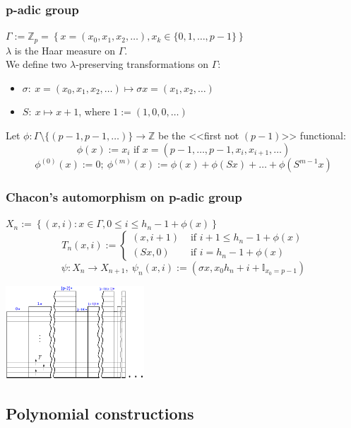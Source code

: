 \begin{frame}
    \frametitle{p-adic group}
    $\Gamma := \mathbb{Z}_p = \left\{x = \left(x_0, x_1, x_2, \ldots \right), x_k \in \{0, 1, \ldots, p - 1\} \right\}$\\
    $\lambda$ is the Haar measure on $\Gamma$. \\
    We define two $\lambda$-preserving transformations on $\Gamma$:\\
    \begin{itemize}
    \item $\sigma:\ x=\left(x_0, x_1, x_2, \ldots \right) \mapsto \sigma x = \left(x_1, x_2, \ldots \right)$
    \item $S:\ x \mapsto x + 1$, where $1:=(1,0,0,\ldots)$
    \end{itemize}
    Let $\phi: \Gamma \setminus \{(p-1,p-1,\ldots)\} \rightarrow \mathbb{Z}$ be the <<first not $(p-1)$>> functional:\\
    \[\phi(x):=x_i\text{ if }x=(p-1, \ldots, p-1, x_i, x_{i+1}, \ldots)\]
    \[\phi^{(0)}(x):=0;\ \phi^{(m)}(x):=\phi(x)+\phi(Sx)+\ldots+\phi(S^{m-1}x)\]
\end{frame}

\begin{frame}
    \frametitle{Chacon's automorphism on p-adic group}  
    $X_n := \left\{(x, i): x \in \Gamma, 0 \le i \le h_n - 1 + \phi(x)\right\}$\\    
    \[
        T_n(x, i):= \begin{cases} 
            (x, i+1) & \text{ if } i+1 \le h_n-1+\phi(x)\\
            (Sx, 0) & \text{ if } i = h_n - 1 + \phi(x)
            \end{cases}
    \]
    \[\psi: X_n \rightarrow X_{n+1},\ \psi_n(x, i) := (\sigma x, x_0 h_n + i + \mathbb{I}_{x_0 = p-1})\]
  \begin{center}
  \includegraphics[height=35mm]{gen_stack.png}
  \end{center}
\end{frame}


\subsection{Polynomial constructions}


